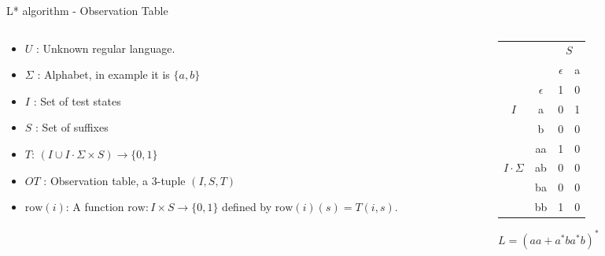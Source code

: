 \documentclass{beamer}
\begin{document}
\begin{frame}{L* algorithm - Observation Table }
    \begin{columns}[T]
        \begin{column}{0.6\textwidth}
            \begin{itemize}
                \item $U$ : Unknown regular language. 
                \item $\Sigma$ : Alphabet, in example it is $\{a,b\}$
                \item $I$ : Set of test states
                \item $S$ : Set of suffixes
                \item $T$: $(I \cup I \cdot \Sigma \times S) \to \{0,1\}$
                \item $OT$ : {\small Observation table, a 3-tuple } $(I,S,T)$
                \item $\text{row}(i)$: A function $\text{row} \colon I \times S \to \{0,1\}$ defined by
                $\text{row}(i)(s) = T(i,s)$.
            \end{itemize}
        \end{column}

        \begin{column}{0.6\textwidth}
            \centering
            \begin{tabular}{cc|c|c}
                &   & \multicolumn{2}{c}{$S$} \\ 
                \multicolumn{2}{c|}{} & $\epsilon$ & a \\ \hline
                & $\epsilon$ & 1 & 0 \\
                {$I$}& a          & 0 & 1 \\
                & b          & 0 & 0 \\\hline
                & aa& 1& 0 \\
                {$I\cdot \Sigma$}        & ab& 0&0\\
                & ba         & 0 & 0 \\
                & bb         & 1 & 0 \\ 
            \end{tabular}
            \par \vspace{0.2cm} 
            {\footnotesize $L = (aa + a^* b a^* b)^*$}
        \end{column}
    \end{columns}
\end{frame}
\end{document}
